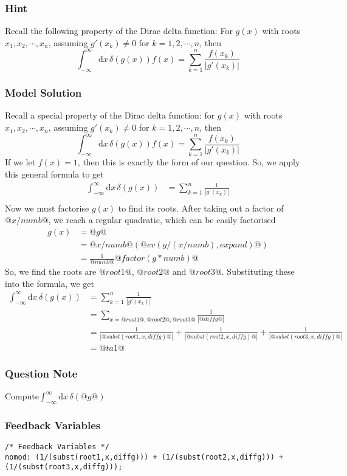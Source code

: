 \documentclass[a4paper,10pt]{article}
\begin{document}
\subsubsection{Hint}
Recall the following property of the Dirac delta function: For \(g(x)\) with roots \(x_1, x_2, \cdots, x_n\), assuming \(g'(x_k) \neq 0 \) for \(k=1,2,\cdots,n\), then \[ \int_{-\infty}^{\infty} \text{d}x \, \delta(g(x))f(x) = \sum_{k=1}^{n}\frac{f(x_k)}{|g'(x_k)|} \]
\subsubsection{Model Solution}
Recall a special property of the Dirac delta function: for \(g(x)\) with roots \(x_1, x_2, \cdots, x_n\), assuming \(g'(x_k) \neq 0 \) for \(k=1,2,\cdots,n\), then \[ \int_{-\infty}^{\infty} \text{d}x \, \delta(g(x))f(x) = \sum_{k=1}^{n}\frac{f(x_k)}{|g'(x_k)|} \] If we let $f(x)=1$, then this is exactly the form of our question. So, we apply this general formula to get \begin{align*} \int_{-\infty}^{\infty} \text{d}x \, \delta(g(x)) &= \sum_{k=1}^{n}\frac{1}{|g'(x_k)|} \\ \end{align*} Now we must factorise \(g(x)\) to find its roots. After taking out a factor of \(@x/numb@\), we reach a regular quadratic, which can be easily factorised \begin{align*} g(x) &= @g@ \\ &= @x/numb@\left(@ev(g/(x/numb),expand)@\right) \\ &= \frac{1}{@numb@}@factor(g*numb)@ \end{align*} So, we find the roots are \(@root1@\), \(@root2@\) and \(@root3@\). Substituting these into the formula, we get \begin{align*} \int_{-\infty}^{\infty} \text{d}x \, \delta(g(x)) &= \sum_{k=1}^{n}\frac{1}{|g'(x_k)|} \\ &= \sum_{x = @root1@, @root2@, @root3@} \frac{1}{|@diffg@|} \\ &= \frac{1}{|@subst(root1,x,diffg)@|} + \frac{1}{|@subst(root2,x,diffg)@|} + \frac{1}{|@subst(root3,x,diffg)@|} \\ &= @ta1@ \end{align*}
\subsubsection{Question Note}
Compute\(\int_{-\infty}^{\infty} \text{d}x \, \delta(@g@)\)
\subsubsection{Feedback Variables}
\begin{lstlisting}
/* Feedback Variables */
nomod: (1/(subst(root1,x,diffg))) + (1/(subst(root2,x,diffg))) + (1/(subst(root3,x,diffg)));
\end{lstlisting}
\end{document}
